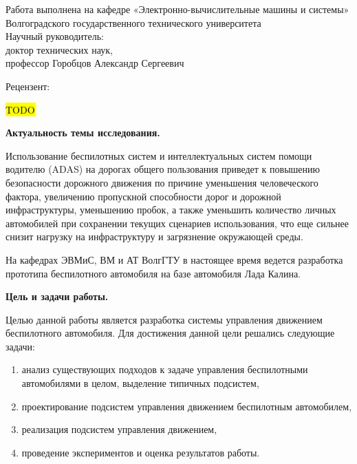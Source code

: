 \begin{nospasing}
\noindent
Работа выполнена на кафедре «Электронно-вычислительные машины и
системы» Волгоградского государственного технического университета\\

\noindent
Научный руководитель:\\

    \setlength{\leftskip}{3cm}
    \noindent
    доктор технических наук, \\
    профессор Горобцов Александр Сергеевич \\

    \setlength{\leftskip}{0pt}

\noindent
Рецензент:

    \setlength{\leftskip}{3cm}
    \noindent
    \hl{TODO} \\

    \setlength{\leftskip}{0pt}

\end{nospasing}

\newpage


\textbf{Актуальность темы исследования.}

Использование беспилотных систем и интеллектуальных систем помощи водителю (ADAS) на дорогах общего
пользования приведет к повышению безопасности дорожного движения по причине уменьшения человеческого
фактора, увеличению пропускной способности дорог и дорожной инфраструктуры, уменьшению пробок, а также
уменьшить количество личных автомобилей при сохранении текущих сценариев использования, что еще
сильнее снизит нагрузку на инфраструктуру и загрязнение окружающей среды.

На кафедрах ЭВМиС, ВМ и АТ ВолгГТУ в настоящее время ведется разработка прототипа беспилотного
автомобиля на базе автомобиля Лада Калина.

\textbf{Цель и задачи работы.}

Целью данной работы является разработка системы управления движением беспилотного автомобиля.
Для достижения данной цели решались следующие задачи:
\begin{enumerate}
    \item анализ существующих подходов к задаче управления беспилотными автомобилями в целом, выделение
    типичных подсистем,
    \item проектирование подсистем управления движением беспилотным автомобилем,
    \item реализация подсистем управления движением,
    \item проведение экспериментов и оценка результатов работы.
\end{enumerate}

